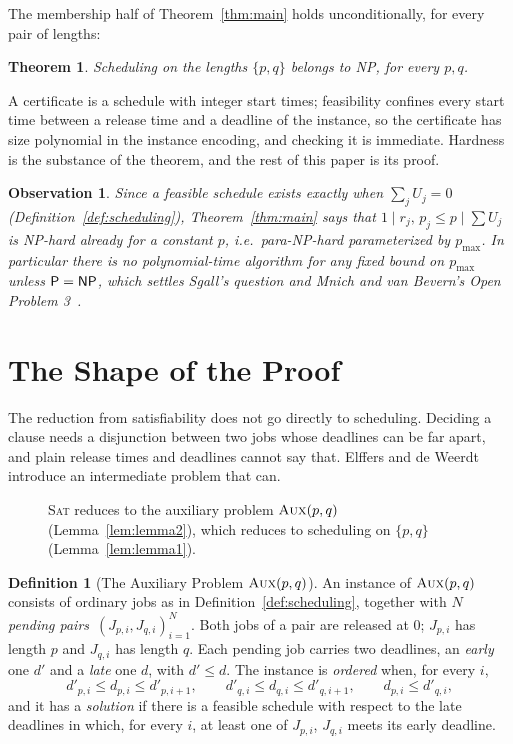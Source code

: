 \documentclass[11pt,a4paper]{article}
\newtheorem{theorem}{Theorem}
\newtheorem{observation}{Observation}
\theoremstyle{definition}
\newtheorem{definition}{Definition}
\newcommand{\AUX}{\textsc{Aux}}
\newcommand{\pmax}{p_{\max}}
\newcommand{\NP}{\textnormal{\textsf{NP}}}
\newcommand{\SAT}{\textsc{Sat}}
\begin{document}
The membership half of Theorem~\ref{thm:main} holds unconditionally, for every pair
of lengths:

\begin{theorem}
Scheduling on the lengths $\{p,q\}$ belongs to \NP, for every $p,q$.
\end{theorem}

A certificate is a schedule with integer start times; feasibility confines
every start time between a release time and a deadline of the instance, so
the certificate has size polynomial in the instance encoding, and checking it is
immediate. Hardness is the substance of the theorem, and the rest of this
paper is its proof.

\begin{observation}
\label{obs:paranphard}
Since a feasible schedule exists exactly when $\sum_j U_j=0$
(Definition~\ref{def:scheduling}), Theorem~\ref{thm:main} says that $1\mid r_j,\,p_j\le
p\mid\sum U_j$ is \NP-hard already for a \emph{constant} $p$, i.e.\
\textnormal{\textsf{para-NP}}-hard parameterized by $\pmax$. In particular
there is no polynomial-time algorithm for any fixed bound on $\pmax$ unless
$\textsf{P}=\NP$, which settles Sgall's question and Mnich and van Bevern's
Open Problem 3~\cite{Sgall12,Mnich18}.
\end{observation}

\section{The Shape of the Proof}

The reduction from satisfiability does not go directly to scheduling.
Deciding a clause needs a disjunction between two jobs whose deadlines can be
far apart, and plain release times and deadlines cannot say that. Elffers and
de Weerdt introduce an intermediate problem that can.

\begin{figure}[h]
\centering

\caption{\SAT{} reduces to the auxiliary problem $\AUX(p,q)$ (Lemma~\ref{lem:lemma2}),
which reduces to scheduling on $\{p,q\}$ (Lemma~\ref{lem:lemma1}).}
\label{fig:shape}
\end{figure}

\begin{definition}[The Auxiliary Problem $\AUX(p,q)$]
\label{def:aux}
An instance of $\AUX(p,q)$ consists of ordinary jobs as in
Definition~\ref{def:scheduling}, together with $N$ \emph{pending pairs}~$(J_{p,i},J_{q,i})_{i=1}^N$. Both jobs of a pair are released at $0$; $J_{p,i}$
has length $p$ and $J_{q,i}$ has length $q$. Each pending job carries two
deadlines, an \emph{early} one $d'$ and a \emph{late} one $d$, with
$d'\le d$. The instance is \emph{ordered} when, for every $i$,
\[
  d'_{p,i}\le d_{p,i}\le d'_{p,i+1}, \qquad
  d'_{q,i}\le d_{q,i}\le d'_{q,i+1}, \qquad
  d_{p,i}\le d'_{q,i},
\]
and it has a \emph{solution} if there is a feasible schedule with respect to
the late deadlines in which, for every $i$, at least one of $J_{p,i}$,
$J_{q,i}$ meets its early deadline.
\end{definition}
\end{document}
